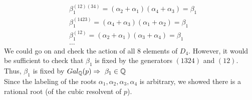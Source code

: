 \documentclass{article}
\begin{document}
\begin{homeworkProblem}
\begin{align}
    & \beta_1^{(12)(34)} = (\alpha_2+\alpha_1)(\alpha_4+\alpha_3) = \beta_1\\
    & \beta_1^{(1423)} = (\alpha_4+\alpha_3)(\alpha_1+\alpha_2)=\beta_1\\
    & \beta_1^{(12)} = (\alpha_2+\alpha_1)(\alpha_3+\alpha_4) = \beta_1\\
    & \ldots 
\end{align}
We could go on and check the action of all $8$ elements of $D_4$. However, it would be sufficient to check that $\beta_1$ is fixed by the generators $(1324)$ and $(12)$.\\
Thus, $\beta_1$ is fixed by $Gal_{\mathbb{Q}}(p) \Rightarrow \ \beta_1 \in \mathbb{Q}$\\
Since the labeling of the roots $\alpha_1,\alpha_2,\alpha_3, \alpha_4$ is arbitrary, we showed there is a rational root (of the cubic resolvent of $p$).


    
\end{homeworkProblem}

\pagebreak
\end{document}
